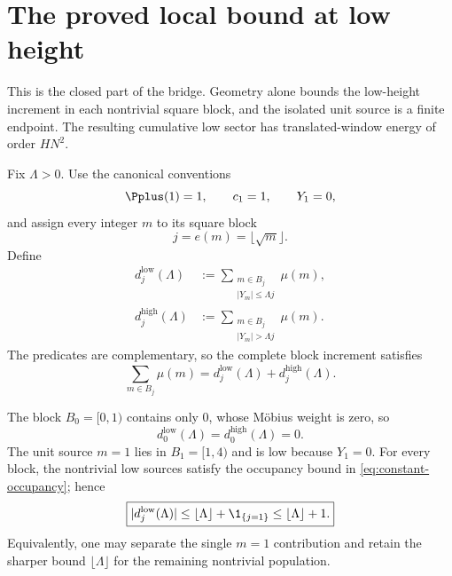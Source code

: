 \section{The proved local bound at low height}
\label{sec:low-cubic}

This is the closed part of the bridge.  Geometry alone bounds the low-height increment in each nontrivial square block, and the isolated unit source is a finite endpoint.  The resulting cumulative low sector has translated-window energy of order $HN^2$.

Fix $\Lambda>0$.  Use the canonical conventions
\[
 \Pplus(1)=1,\qquad c_1=1,\qquad Y_1=0,
\]
and assign every integer $m$ to its square block
\begin{equation}
 j=e(m)=\lfloor\sqrt m\rfloor.
 \label{eq:entry-block}
\end{equation}
Define
\begin{align}
 d_j^{\mathrm{low}}(\Lambda)
 &:={}
 \sum_{\substack{m\in B_j\\|Y_m|\le\Lambda j}}\mu(m),
 \label{eq:low-block-increment}\\
 d_j^{\mathrm{high}}(\Lambda)
 &:={}
 \sum_{\substack{m\in B_j\\|Y_m|>\Lambda j}}\mu(m).
 \label{eq:high-block-increment}
\end{align}
The predicates are complementary, so the complete block increment satisfies
\begin{equation}
 \sum_{m\in B_j}\mu(m)
 =d_j^{\mathrm{low}}(\Lambda)+d_j^{\mathrm{high}}(\Lambda).
 \label{eq:block-low-high-recombination}
\end{equation}

The block $B_0=[0,1)$ contains only $0$, whose M\"obius weight is zero, so
\begin{equation}
 d_0^{\mathrm{low}}(\Lambda)=d_0^{\mathrm{high}}(\Lambda)=0.
 \label{eq:zero-block-endpoint}
\end{equation}
The unit source $m=1$ lies in $B_1=[1,4)$ and is low because $Y_1=0$.  For every block, the nontrivial low sources satisfy the occupancy bound in \cref{eq:constant-occupancy}; hence
\begin{equation}
 \boxed{
 |d_j^{\mathrm{low}}(\Lambda)|
 \le \lfloor\Lambda\rfloor+\1_{\{j=1\}}
 \le \lfloor\Lambda\rfloor+1.
 }
 \label{eq:low-block-bound}
\end{equation}
Equivalently, one may separate the single $m=1$ contribution and retain the sharper bound $\lfloor\Lambda\rfloor$ for the remaining nontrivial population.

